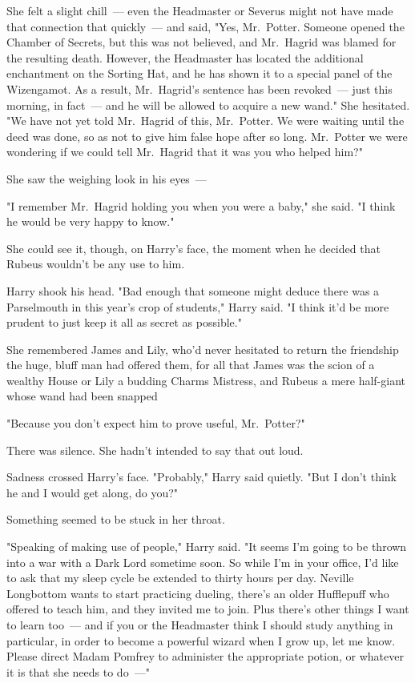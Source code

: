 She felt a slight chill~--- even the Headmaster or Severus might not have made
that connection that quickly~--- and said, "Yes, Mr.~Potter. Someone opened the
Chamber of Secrets, but this was not believed, and Mr.~Hagrid was blamed for
the resulting death. However, the Headmaster has located the additional
enchantment on the Sorting Hat, and he has shown it to a special panel of the
Wizengamot. As a result, Mr.~Hagrid's sentence has been revoked~--- just this
morning, in fact~--- and he will be allowed to acquire a new wand." She
hesitated. "We{\el} have not yet told Mr.~Hagrid of this, Mr.~Potter. We
were waiting until the deed was done, so as not to give him false hope after so
long. Mr.~Potter{\el} we were wondering if we could tell Mr.~Hagrid that it
was you who helped him\el?"

She saw the weighing look in his eyes~---

"I remember Mr.~Hagrid holding you when you were a baby," she said. "I think he
would be very happy to know."

She could see it, though, on Harry's face, the moment when he decided that
Rubeus wouldn't be any use to him.

Harry shook his head. "Bad enough that someone might deduce there was a
Parselmouth in this year's crop of students," Harry said. "I think it'd be more
prudent to just keep it all as secret as possible."

She remembered James and Lily, who'd never hesitated to return the friendship
the huge, bluff man had offered them, for all that James was the scion of a
wealthy House or Lily a budding Charms Mistress, and Rubeus a mere half-giant
whose wand had been snapped{\el}

"Because you don't expect him to prove useful, Mr.~Potter?"

There was silence. She hadn't intended to say that out loud.

Sadness crossed Harry's face. "Probably," Harry said quietly. "But I don't
think he and I would get along, do you?"

Something seemed to be stuck in her throat.

"Speaking of making use of people," Harry said. "It seems I'm going to be
thrown into a war with a Dark Lord sometime soon. So while I'm in your office,
I'd like to ask that my sleep cycle be extended to thirty hours per day.
Neville Longbottom wants to start practicing dueling, there's an older
Hufflepuff who offered to teach him, and they invited me to join. Plus there's
other things I want to learn too~--- and if you or the Headmaster think I should
study anything in particular, in order to become a powerful wizard when I grow
up, let me know. Please direct Madam Pomfrey to administer the appropriate
potion, or whatever it is that she needs to do~---"

